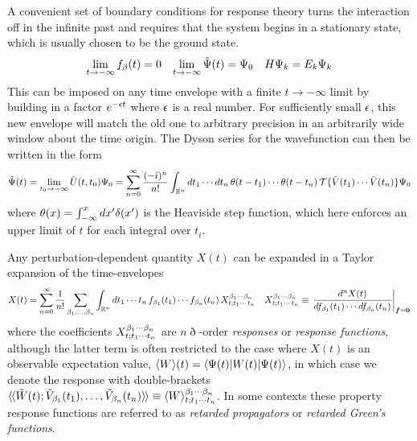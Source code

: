 \documentclass[11pt]{article}
\numberwithin{equation}{section}
\begin{document}
\begin{rmk}
A convenient set of boundary conditions for response theory turns the interaction off in the infinite past and requires that the system begins in a stationary state, which is usually chosen to be the ground state.
\begin{align}
  \lim_{t\rightarrow-\infty}
  f_{\beta }(t)
=
  0
&&
  \lim_{t\rightarrow-\infty}
  \tilde{\Psi }(t)
=
  \Psi _0
&&
  H
  \Psi _k
=
  E_k
  \Psi _k
\end{align}
This can be imposed on any time envelope with a finite $t\rightarrow-\infty$ limit by building in a factor $e^{-\epsilon  t}$ where $\epsilon $ is a real number.
For sufficiently small $\epsilon $, this new envelope will match the old one to arbitrary precision in an arbitrarily wide window about the time origin.
The Dyson series for the wavefunction can then be written in the form
\begin{align}
  \tilde{\Psi }(t)
=
  \lim_{t_0\rightarrow-\infty}
  \tilde{U}(t,t_0)
  \Psi _0
=
  \sum_{n=0}^\infty
  \frac {(-i)^n}{n!}
  \int_{\mathbb{R}^n}
  dt_1\cdots dt_n\,
  \theta (t-t_1)
  \cdots
  \theta (t-t_n)\,
  \mathcal{T}\{
    \tilde{V}(t_1)
    \cdots
    \tilde{V}(t_n)
  \}
  \Psi _0
\end{align}
where
$
  \theta (x)
=
  \int_{-\infty}^x
  dx'
  \delta (x')
$
is the Heaviside step function, which here enforces an upper limit of $t$ for each integral over $t_i$.
\end{rmk}

\begin{dfn}
Any perturbation-dependent quantity $X(t)$ can be expanded in a Taylor expansion of the time-envelopes
\begin{align}
\label{eq:}
  X(t)
=
  \sum_{n=0}^\infty
  \fr{1}{n!}
  \sum_{\b_1,\ld,\b_n}
  \int_{\mb{R}^n}
  dt_1\cd t_n\,
  f_{\b_1}(t_1)
  \cd
  f_{\b_n}(t_n)\,
  X^{\b_1\cd \b_n}_{t;t_1\cd\,t_n}
&&
  X^{\b_1\cd \b_n}_{t;t_1\cd\,t_n}
\equiv
  \left.
  \fd{^n
    X(t)
  }{
    f_{\b_1}(t_1)
    \cd
    df_{\b_n}(t_n)
  }
  \right|_{\bm{f}=\bo{0}}
\end{align}
where the coefficients $X_{t;t_1\cdots t_n}^{\beta _1\cdots \beta _n}$ are $n\eth$-order \textit{responses} or \textit{response functions}, although the latter term is often restricted to the case where $X(t)$ is an observable expectation value, $\langle W\rangle(t)=\langle\Psi (t)|W(t)|\Psi (t)\rangle$, in which case we denote the response with double-brackets
$
  {{\langle}\hspace{-1pt}{\langle}} \tilde{W}(t); \tilde{V}_{\beta _1}(t_1),\ldots,\tilde{V}_{\beta _n}(t_n) {{\rangle}\hspace{-1pt}{\rangle}}
\equiv
  \langle W\rangle_{t;t_1\cdots t_n}^{\beta _1\cdots \beta _n}
$.
In some contexts these property response functions are referred to as \textit{retarded propagators} or \textit{retarded Green's functions}.
\end{dfn}
\end{document}
